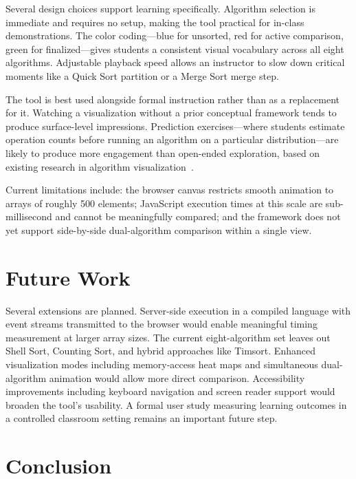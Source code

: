 \documentclass[conference]{IEEEtran}
\begin{document}
Several design choices support learning specifically. Algorithm selection is
immediate and requires no setup, making the tool practical for in-class
demonstrations. The color coding---blue for unsorted, red for active
comparison, green for finalized---gives students a consistent visual vocabulary
across all eight algorithms. Adjustable playback speed allows an instructor to
slow down critical moments like a Quick Sort partition or a Merge Sort merge
step.

The tool is best used alongside formal instruction rather than as a replacement
for it. Watching a visualization without a prior conceptual framework tends to
produce surface-level impressions. Prediction exercises---where students
estimate operation counts before running an algorithm on a particular
distribution---are likely to produce more engagement than open-ended
exploration, based on existing research in algorithm
visualization~\cite{hundhausen2002,naps2002,stasko2009}.

Current limitations include: the browser canvas restricts smooth animation to
arrays of roughly 500 elements; JavaScript execution times at this scale are
sub-millisecond and cannot be meaningfully compared; and the framework does not
yet support side-by-side dual-algorithm comparison within a single view.

\section{Future Work}

Several extensions are planned. Server-side execution in a compiled language
with event streams transmitted to the browser would enable meaningful timing
measurement at larger array sizes. The current eight-algorithm set leaves out
Shell Sort, Counting Sort, and hybrid approaches like Timsort. Enhanced
visualization modes including memory-access heat maps and simultaneous
dual-algorithm animation would allow more direct comparison. Accessibility
improvements including keyboard navigation and screen reader support would
broaden the tool's usability. A formal user study measuring learning outcomes
in a controlled classroom setting remains an important future step.

\section{Conclusion}
\end{document}
